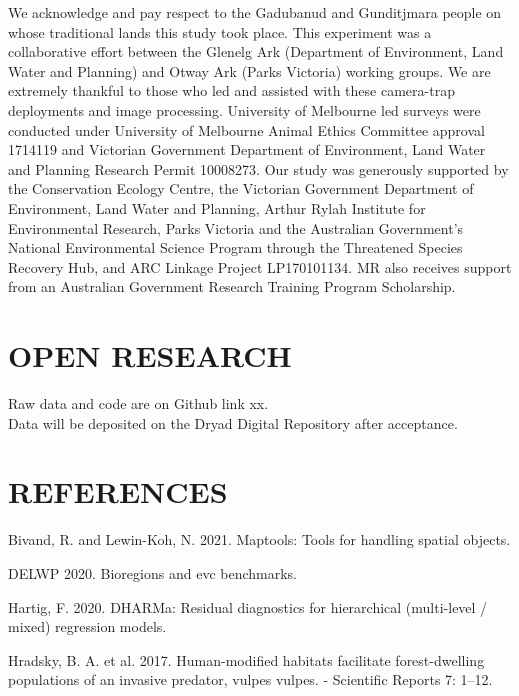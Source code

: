 \documentclass[]{elsarticle} %
\begin{document}
We acknowledge and pay respect to the Gadubanud and Gunditjmara people on whose traditional lands this study took place. This experiment was a collaborative effort between the Glenelg Ark (Department of Environment, Land Water and Planning) and Otway Ark (Parks Victoria) working groups. We are extremely thankful to those who led and assisted with these camera-trap deployments and image processing. University of Melbourne led surveys were conducted under University of Melbourne Animal Ethics Committee approval 1714119 and Victorian Government Department of Environment, Land Water and Planning Research Permit 10008273. Our study was generously supported by the Conservation Ecology Centre, the Victorian Government Department of Environment, Land Water and Planning, Arthur Rylah Institute for Environmental Research, Parks Victoria and the Australian Government's National Environmental Science Program through the Threatened Species Recovery Hub, and ARC Linkage Project LP170101134. MR also receives support from an Australian Government Research Training Program Scholarship.

\hypertarget{open-research}{%
\section{OPEN RESEARCH}\label{open-research}}

Raw data and code are on Github link xx.\\
Data will be deposited on the Dryad Digital Repository after acceptance.

\newpage

\hypertarget{references}{%
\section*{REFERENCES}\label{references}}

\hypertarget{refs}{}
\leavevmode\hypertarget{ref-maptools}{}%
Bivand, R. and Lewin-Koh, N. 2021. Maptools: Tools for handling spatial objects.

\leavevmode\hypertarget{ref-delwp2020}{}%
DELWP 2020. Bioregions and evc benchmarks.

\leavevmode\hypertarget{ref-DHARMa}{}%
Hartig, F. 2020. DHARMa: Residual diagnostics for hierarchical (multi-level / mixed) regression models.

\leavevmode\hypertarget{ref-hradsky2017human}{}%
Hradsky, B. A. et al. 2017. Human-modified habitats facilitate forest-dwelling populations of an invasive predator, vulpes vulpes. - Scientific Reports 7: 1--12.
\end{document}
